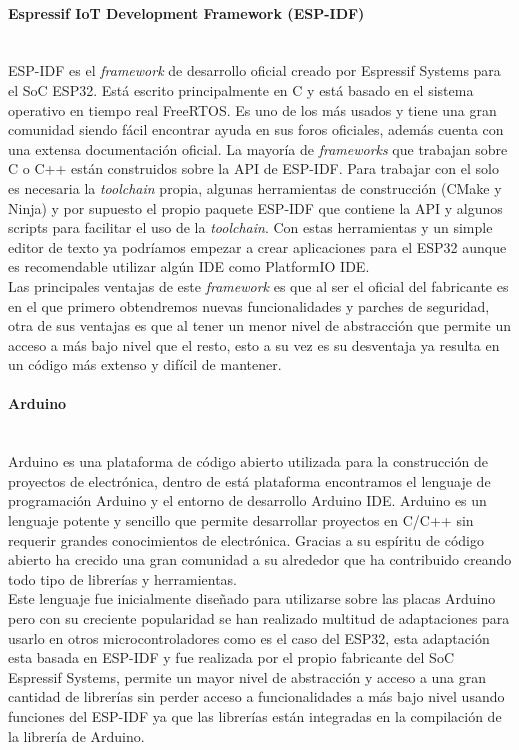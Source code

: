 \documentclass[../proyecto.tex]{subfiles}
\begin{document}
\paragraph{Espressif IoT Development Framework (ESP-IDF)}\mbox{}\\
ESP-IDF es el \textit{framework} de desarrollo oficial creado por Espressif Systems para el SoC ESP32. Está escrito principalmente en C  y está basado en el sistema operativo en tiempo real FreeRTOS. Es uno de los más usados y tiene una gran comunidad siendo fácil encontrar ayuda en sus foros oficiales, además cuenta con una extensa documentación oficial. La mayoría de \textit{frameworks} que trabajan sobre C o C++ están construidos sobre la API de ESP-IDF. Para trabajar con el solo es necesaria la \textit{toolchain} propia, algunas herramientas de construcción (CMake y Ninja) y por supuesto el propio paquete ESP-IDF que contiene la API y algunos scripts para facilitar el uso de la \textit{toolchain}. Con estas herramientas y un simple editor de texto ya podríamos empezar a crear aplicaciones para el ESP32 aunque es recomendable utilizar algún IDE como PlatformIO IDE.\\

 Las principales ventajas de este \textit{framework} es que al ser el oficial del fabricante es en el que primero obtendremos nuevas funcionalidades y parches de seguridad, otra de sus ventajas es que al tener un menor nivel de abstracción que permite un acceso a más bajo nivel que el resto, esto a su vez es su desventaja ya resulta en un código más extenso y difícil de mantener.

\paragraph{Arduino}\mbox{}\\
Arduino es una plataforma de código abierto utilizada para la construcción de proyectos de electrónica, dentro de está plataforma encontramos el lenguaje de programación Arduino y el entorno de desarrollo Arduino IDE. Arduino es un lenguaje potente y sencillo que permite desarrollar proyectos en C/C++ sin requerir grandes conocimientos de electrónica. Gracias a su espíritu de código abierto ha crecido una gran comunidad a su alrededor que ha contribuido creando todo tipo de librerías y herramientas.\\

Este lenguaje fue inicialmente diseñado para utilizarse sobre las placas Arduino pero con su creciente popularidad se han realizado multitud de adaptaciones para usarlo en otros microcontroladores como es el caso del ESP32, esta adaptación esta basada en ESP-IDF y fue realizada por el propio fabricante del SoC Espressif Systems, permite un mayor nivel de abstracción y acceso a una gran cantidad de librerías sin perder acceso a funcionalidades a más bajo nivel usando funciones del ESP-IDF ya que las librerías están integradas en la compilación de la librería de Arduino.\\
\end{document}
